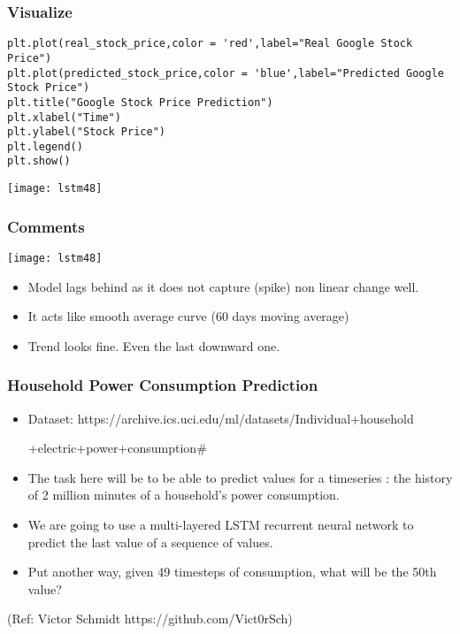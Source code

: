 \begin{frame}[fragile] \frametitle{Visualize}
\begin{lstlisting}
plt.plot(real_stock_price,color = 'red',label="Real Google Stock Price")
plt.plot(predicted_stock_price,color = 'blue',label="Predicted Google Stock Price")
plt.title("Google Stock Price Prediction")
plt.xlabel("Time")
plt.ylabel("Stock Price")
plt.legend()
plt.show()
\end{lstlisting}
\begin{center}
\texttt{[image: lstm48]}
\end{center}
\end{frame}


\begin{frame}[fragile] \frametitle{Comments}
\begin{center}
\texttt{[image: lstm48]}
\end{center}
\begin{itemize}
\item Model lags behind as it does not capture (spike) non linear change well.
\item It acts like smooth average curve (60 days moving average)
\item Trend looks fine. Even the last downward one.
\end{itemize}
\end{frame}









\begin{frame}[fragile] \frametitle{Household Power Consumption Prediction}
\begin{itemize}
\item Dataset:  https://archive.ics.uci.edu/ml/datasets/Individual+household

+electric+power+consumption\#
\item The task here will be to be able to predict values for a timeseries : the history of 2 million minutes of a household's power consumption. 
\item We are going to use a multi-layered LSTM recurrent neural network to predict the last value of a sequence of values. 
\item Put another way, given 49 timesteps of consumption, what will be the 50th value?
\end{itemize}
(Ref: Victor Schmidt https://github.com/Vict0rSch)
\end{frame}



